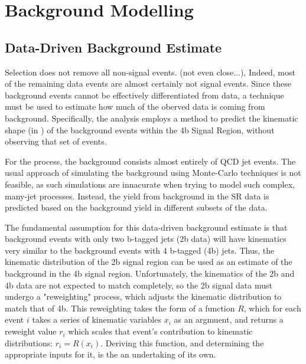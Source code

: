 \chapter{Background Modelling} \label{chapter:background}

\section{Data-Driven Background Estimate}

    Selection does not remove all non-signal events. (not even close...),
    Indeed, most of the remaining data events are almost certainly not signal events.
    Since these background events cannot be effectively differentiated from data,
        a technique must be used to estimate how much of the oberved data is coming from background.
    Specifically, the analysis employs a method to predict the kinematic shape (in \mhh)
        of the background events within the 4b Signal Region,
        without observing that set of events.

    For the \vbfproc process, the background consists almost entirely of QCD jet events.
    The usual approach of simulating the background using Monte-Carlo techniques is not feasible,
        as such simulations are innacurate when trying to model such complex, many-jet processes.
    Instead, the yield from background in the SR data is predicted based on the background yield in different subsets of the data.
        
    The fundamental assumption for this data-driven background estimate
        is that background events with only two b-tagged jets (2b data)
        will have kinematics very similar to the background events with 4 b-tagged (4b) jets.
    Thus, the kinematic distribution of the 2b signal region can be used as an estimate of the background in the 4b signal region.
    Unfortunately, the kinematics of the 2b and 4b data are not expected to match completely,
        so the 2b signal data must undergo a "reweighting" process,
        which adjusts the kinematic distribution to match that of 4b.
    This reweighting takes the form of a function $R$,
        which for each event $i$ takes a series of kinematic variables $x_i$ as an argmuent,
        and returns a reweight value $r_i$ which scales that event's contribution to kinematic distributions:
        $r_i = R(x_i)$.
    Deriving this function, and determining the appropriate inputs for it, is the an undertaking of its own.

